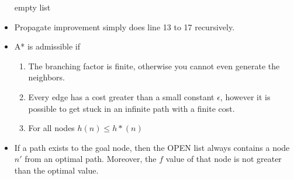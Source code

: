 \documentclass[a4paper]{article}
\begin{document}
\begin{itemize}
\begin{algorithm}[H]
\begin{algorithmic}[1]
                        \EndIf
                    \EndIf
                \EndFor
            \EndWhile
            \Return empty list
        \end{algorithmic}
    \end{algorithm}
    \item Propagate improvement simply does line 13 to 17 recursively.
    \item A* is admissible if
    \begin{enumerate}
        \item The branching factor is finite, otherwise you cannot even generate the neighbors.
        \item Every edge has a cost greater than a small constant $\epsilon$, however it is possible to get stuck in an infinite path with a finite cost.
        \item For all nodes $h(n)\leq h*(n)$
    \end{enumerate}
    \item If a path exists to the goal node, then the OPEN list always contains a node $n'$ from an optimal path. Moreover, the $f$ value of that node is not greater than the optimal value.
\end{itemize}
\end{document}
